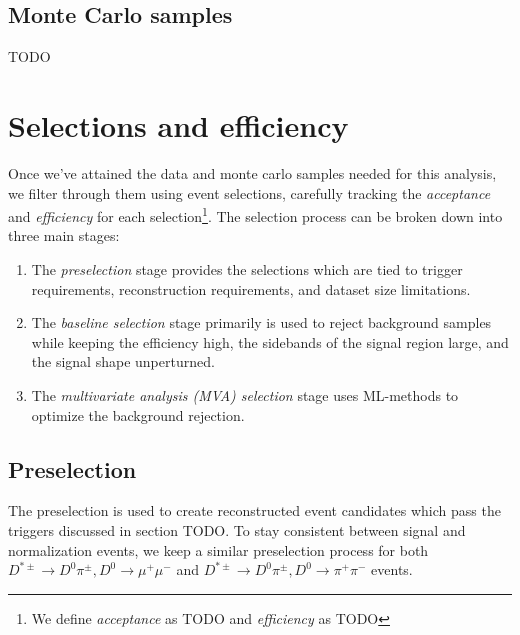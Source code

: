   


\subsection{Monte Carlo samples}

TODO

\section{Selections and efficiency}

Once we've attained the data and monte carlo samples needed for this analysis, we filter through them using event selections, carefully tracking the \textit{acceptance} and \textit{efficiency} for each selection\footnote{We define \textit{acceptance} as TODO and \textit{efficiency} as TODO}. The selection process can be broken down into three main stages:
\begin{enumerate}
    \item The \textit{preselection} stage provides the selections which are tied to trigger requirements, reconstruction requirements, and dataset size limitations.
    \item The \textit{baseline selection} stage primarily is used to reject background samples while keeping the efficiency high, the sidebands of the signal region large, and the signal shape unperturned. 
    \item The \textit{multivariate analysis (MVA) selection} stage uses ML-methods to optimize the background rejection.
\end{enumerate}

\subsection{Preselection}
\label{subsec:preselection}

The preselection is used to create reconstructed event candidates which pass the triggers discussed in section TODO. To stay consistent between signal and normalization events, we keep a similar preselection process for both $D^{*\pm} \to D^0 \pi^\pm, D^0 \to \mu^+ \mu^-$ and $D^{*\pm} \to D^0 \pi^\pm, D^0 \to \pi^+ \pi^-$ events.

